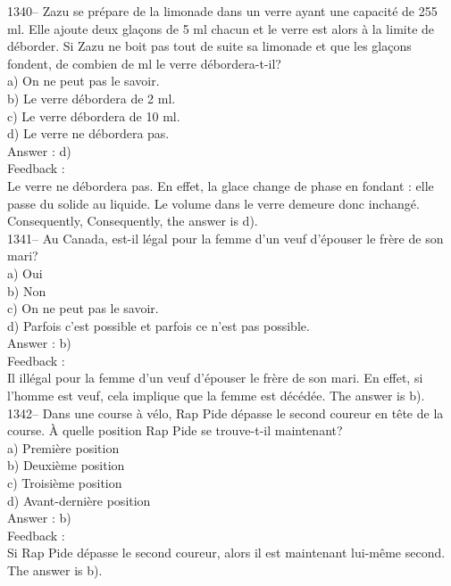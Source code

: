 ﻿\documentclass[letterpaper, 12pt]{article}
\begin{document}
1340-- Zazu se pr\'epare de la limonade dans un verre ayant une capacit\'e
de 255 ml.  Elle ajoute deux gla\c cons de 5 ml chacun et le verre est alors
\`a la limite de d\'eborder.  Si Zazu ne boit pas tout de suite sa limonade
et que les gla\c cons fondent, de combien de ml le verre d\'ebordera-t-il?\\
a) On ne peut pas le savoir.\\
b) Le verre d\'ebordera de 2 ml.\\
c) Le verre d\'ebordera de 10 ml.\\
d) Le verre ne d\'ebordera pas.\\

Answer : d)\\

Feedback : \\
Le verre ne d\'ebordera pas.  En effet, la glace change de phase en fondant
: elle passe du solide au liquide.  Le volume dans le verre demeure donc
inchang\'e.  Consequently, Consequently, the answer is d).\\

1341-- Au Canada, est-il l\'egal pour la femme d'un veuf d'\'epouser le
fr\`ere de son mari?\\
a) Oui\\
b) Non\\
c) On ne peut pas le savoir.\\
d) Parfois c'est possible et parfois ce n'est pas possible.\\

Answer : b)\\

Feedback : \\
Il ill\'egal pour la femme d'un veuf d'\'epouser le fr\`ere de son mari. En
effet, si l'homme est veuf, cela implique que la femme est d\'ec\'ed\'ee.
The answer is b).\\

1342-- Dans une course \`a v\'elo, Rap Pide d\'epasse le second coureur en
t\^ete de la course.  \`A quelle position Rap Pide se trouve-t-il
maintenant?\\
a) Premi\`ere position\\
b) Deuxi\`eme position\\
c) Troisi\`eme position\\
d) Avant-derni\`ere position\\

Answer : b)\\

Feedback : \\
Si Rap Pide d\'epasse le second coureur, alors il est maintenant lui-m\^eme
second.  The answer is b).\\
\end{document}
